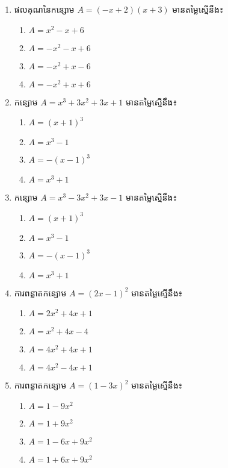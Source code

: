 \begin{enumerate}
\item ផលគុណនៃកន្សោម $A=(-x+2)(x+3)$ មានតម្លៃស្មើនឹង៖
\begin{multicols}{2}
\begin{enumerate}[label=\alph*.]
\item $A=x^2-x+6$
\item $A=-x^2-x+6$
\item $A=-x^2+x-6$
\item $A=-x^2+x+6$
\end{enumerate}
\end{multicols}

\item កន្សោម $A=x^3+3x^2+3x+1$ មានតម្លៃស្មើនឹង៖
\begin{multicols}{4}
\begin{enumerate}[label=\alph*.]
\item $A=(x+1)^3$
\item $A=x^3-1$
\item $A=-(x-1)^3$
\item $A=x^3+1$
\end{enumerate}
\end{multicols}

\item កន្សោម $A=x^3-3x^2+3x-1$ មានតម្លៃស្មើនឹង៖
\begin{multicols}{4}
\begin{enumerate}[label=\alph*.]
\item $A=(x+1)^3$
\item $A=x^3-1$
\item $A=-(x-1)^3$
\item $A=x^3+1$
\end{enumerate}
\end{multicols}

\item ការពន្លាតកន្សោម $A=(2x-1)^2$ មានតម្លៃស្មើនឹង៖
\begin{multicols}{2}
\begin{enumerate}[label=\alph*.]
\item $A=2x^2+4x+1$
\item $A=x^2+4x-4$
\item $A=4x^2+4x+1$
\item $A=4x^2-4x+1$
\end{enumerate}
\end{multicols}

\item ការពន្លាតកន្សោម $A=(1-3x)^2$ មានតម្លៃស្មើនឹង៖
\begin{multicols}{2}
\begin{enumerate}[label=\alph*.]
\item $A=1-9x^2$
\item $A=1+9x^2$
\item $A=1-6x+9x^2$
\item $A=1+6x+9x^2$
\end{enumerate}
\end{multicols}


\end{enumerate}
